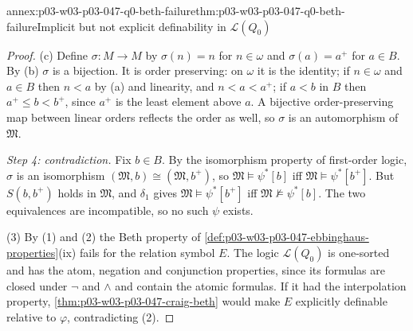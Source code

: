 \begin{annexitem}{annex:p03-w03-p03-047-q0-beth-failure}{thm:p03-w03-p03-047-q0-beth-failure}{Implicit but not explicit definability in \(\mathscr L(Q_0)\)}
\begin{proof}
(c) Define \(\sigma:M\to M\) by \(\sigma(n)=n\) for \(n\in\omega\) and
\(\sigma(a)=a^+\) for \(a\in B\).  By (b) \(\sigma\) is a bijection.  It is
order preserving: on \(\omega\) it is the identity; if \(n\in\omega\) and
\(a\in B\) then \(n<a\) by (a) and linearity, and \(n<a<a^+\); if
\(a<b\) in \(B\) then \(a^+\le b<b^+\), since \(a^+\) is the least element
above \(a\).  A bijective order-preserving map between linear orders
reflects the order as well, so \(\sigma\) is an automorphism of
\(\mathfrak M\).

\emph{Step 4: contradiction.}  Fix \(b\in B\).  By the isomorphism property
of first-order logic, \(\sigma\) is an isomorphism
\((\mathfrak M,b)\cong(\mathfrak M,b^+)\), so
\(\mathfrak M\models\psi^*[b]\) iff \(\mathfrak M\models\psi^*[b^+]\).  But
\(S(b,b^+)\) holds in \(\mathfrak M\), and \(\delta_1\) gives
\(\mathfrak M\models\psi^*[b^+]\) iff \(\mathfrak M\not\models\psi^*[b]\).
The two equivalences are incompatible, so no such \(\psi\) exists.

(3) By (1) and (2) the Beth property of
\cref{def:p03-w03-p03-047-ebbinghaus-properties}(ix) fails for the relation
symbol \(E\).  The logic \(\mathscr L(Q_0)\) is one-sorted and has the atom,
negation and conjunction properties, since its formulas are closed under
\(\neg\) and \(\land\) and contain the atomic formulas.  If it had the
interpolation property, \cref{thm:p03-w03-p03-047-craig-beth} would make
\(E\) explicitly definable relative to \(\varphi\), contradicting (2).
\end{proof}
\end{annexitem}

